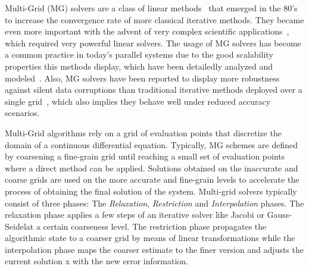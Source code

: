 Multi-Grid (MG) solvers are a class of linear methods~\cite{Hackbusch1991} that emerged in the 80's to increase the convergence rate of more classical iterative methods. 
They became even more important with the advent of very complex scientific applications~\cite{Ashby1996}, which required very powerful linear solvers. 
The usage of MG solvers has become a common practice in today's parallel systems due to the good scalability properties this methods display, which have been detailedly analyzed and modeled~\cite{Gahvari11}.
Also, MG solvers have been reported to display more robustness against silent data corruptions than traditional iterative methods deployed over a single grid~\cite{Casas12}, which also implies they behave well under reduced accuracy scenarios.

Multi-Grid algorithms rely on a grid of evaluation points that discretize the domain of a continuous differential equation.
Typically, MG schemes are defined by coarsening a fine-grain grid until reaching a small set of evaluation points where a direct method can be applied.
Solutions obtained on the inaccurate and coarse grids are used on the more accurate and fine-grain levels to accelerate the process of obtaining the final solution of the system. 
Multi-grid solvers typically consist of three phases: The \textit{Relaxation}, \textit{Restriction} and \textit{Interpolation} phases.
The relaxation phase applies a few steps of
an iterative solver like Jacobi or Gauss-Seidelat a certain coarseness level. 
The restriction phase propagates the algorithmic state to a coarser grid by means of linear transformations while the interpolation phase
maps the coarser estimate to the finer version and adjusts the current solution x with the new error information.

